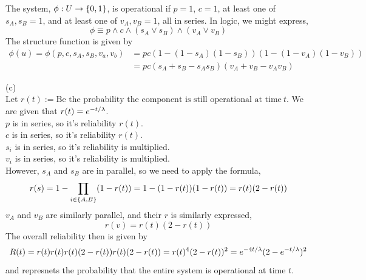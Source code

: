 \documentclass[a4paper,12pt]{report}
\begin{document}
The system, $\phi: U\to\left\lbrace 0,1 \right\rbrace$, is operational if $p=1$, $c=1$, at least one of $s_A,s_B=1$, and at least one of $v_A, v_B=1$, all in series. In logic, we might express,
$$
    \phi \equiv p\land c\land (s_A \vee s_B) \land (v_A \vee v_B)
$$
The structure function is given by
\begin{align*}
    \phi(u) = \phi(p,c,s_A,s_B,v_a,v_b) &= pc(1 - (1-s_A)(1-s_B))(1 - (1-v_A)(1-v_B)) \\
        &= pc(s_A + s_B - s_As_B)(v_A + v_B - v_Av_B)     
\end{align*}

\sol(c) \\
Let $r(t):=\text{Be the probability the component is still operational at time}\ t$. We are given that $r(t) = e^{-t/\lambda}$. \\
$p$ is in series, so it's reliability $r(t)$. \\
$c$ is in series, so it's reliability $r(t)$. \\
$s_i$ is in series, so it's reliability is multiplied. \\
$v_i$ is in series, so it's reliability is multiplied. \\
However, $s_A$ and $s_B$ are in parallel, so we need to apply the formula,
$$
    r(s) = 1 - \prod_{i\in\left\lbrace A,B \right\rbrace} (1-r(t)) = 1 - (1-r(t))(1-r(t)) = r(t)(2 - r(t))
$$
$v_A$ and $v_B$ are similarly parallel, and their $r$ is similarly expressed,
$$
    r(v) = r(t)(2-r(t))
$$
The overall reliability then is given by
$$
    R(t) = r(t) r(t) r(t)(2-r(t)) r(t)(2-r(t)) = r(t)^4(2-r(t))^2 = e^{-4t/\lambda}(2-e^{-t/\lambda})^2
$$
and represnets the probability that the entire system is operational at time $t$.
\end{document}
